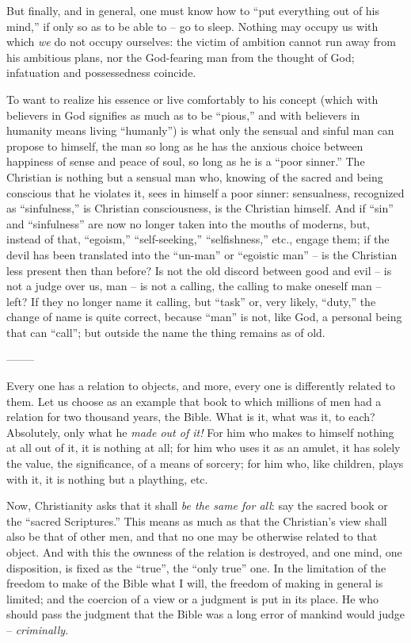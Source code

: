 \documentclass[12pt,a4paper]{book}
\begin{document}
But finally, and in general, one must know how to ``put everything out of his 
mind,'' if only so as to be able to -- go to sleep. Nothing may occupy us 
with which \textit{we} do not occupy ourselves: the victim of ambition cannot 
run away from his ambitious plans, nor the God-fearing man from the thought of 
God; infatuation and possessedness coincide.

To want to realize his essence or live comfortably to his concept (which with 
believers in God signifies as much as to be ``pious,'' and with believers in 
humanity means living ``humanly'') is what only the sensual and sinful man 
can propose to himself, the man so long as he has the anxious choice between 
happiness of sense and peace of soul, so long as he is a ``poor sinner.'' 
The Christian is nothing but a sensual man who, knowing of the sacred and 
being conscious that he violates it, sees in himself a poor sinner: 
sensualness, recognized as ``sinfulness,'' is Christian consciousness, is 
the Christian himself. And if ``sin'' and ``sinfulness'' are now no longer 
taken into the mouths of moderns, but, instead of that, ``egoism,'' 
``self-seeking,'' ``selfishness,'' etc., engage them; if the devil has 
been translated into the ``un-man'' or ``egoistic man'' -- is the 
Christian less present then than before? Is not the old discord between good 
and evil -- is not a judge over us, man -- is not a calling, the calling to 
make oneself man -- left? If they no longer name it calling, but ``task'' 
or, very likely, ``duty,'' the change of name is quite correct, because 
``man'' is not, like God, a personal being that can ``call''; but outside 
the name the thing remains as of old.

\begin{center}
--------\end{center}


Every one has a relation to objects, and more, every one is differently 
related to them. Let us choose as an example that book to which millions of 
men had a relation for two thousand years, the Bible. What is it, what was it, 
to each? Absolutely, only what he \textit{made out of it!} For him who makes 
to himself nothing at all out of it, it is nothing at all; for him who uses it 
as an amulet, it has solely the value, the significance, of a means of 
sorcery; for him who, like children, plays with it, it is nothing but a 
plaything, etc.

Now, Christianity asks that it shall \textit{be the same for all}: say the 
sacred book or the ``sacred Scriptures.'' This means as much as that the 
Christian's view shall also be that of other men, and that no one may be 
otherwise related to that object. And with this the ownness of the relation is 
destroyed, and one mind, one disposition, is fixed as the ``true'', the 
``only true'' one. In the limitation of the freedom to make of the Bible 
what I will, the freedom of making in general is limited; and the coercion of 
a view or a judgment is put in its place. He who should pass the judgment that 
the Bible was a long error of mankind would judge -- \textit{criminally}.
\end{document}
